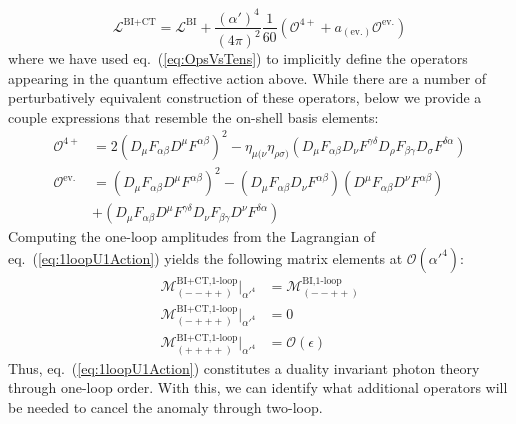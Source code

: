 \documentclass[11pt,letter]{article}
\def\eqn#1{eq.~(\ref{#1})}
\begin{document}
\begin{equation}
\label{eq:1loopU1Action}
\mathcal{L}^{\text{BI}+\text{CT}} = \mathcal{L}^{\text{BI}} + \frac{(\alpha')^4}{(4\pi)^2}\frac{1}{60}\left(\mathcal{O}^{4+}+ a_{({\text{ev.}})}\mathcal{O}^{\text{ev.}}\right)
\end{equation}
where we have used \eqn{eq:OpsVsTens} to implicitly define the operators appearing in the quantum effective action above. While there are a number of perturbatively equivalent construction of these operators, below we provide a couple expressions that resemble the on-shell basis elements:
\begin{equation}
\begin{split} 
\mathcal{O}^{4+} &= 2 (D_\mu F_{\alpha \beta} D^\mu  F^{\alpha \beta})^2 - \eta_{\mu(\nu}\eta_{\rho\sigma)}(D_\mu F_{\alpha \beta} D_\nu  F^{\gamma\delta} D_\rho F_{\beta \gamma } D_\sigma F^{\delta \alpha})
\\
\mathcal{O}^{\text{ev.}} &= 
(D_\mu F_{\alpha \beta} D^\mu  F^{\alpha \beta})^2 - (D_\mu F_{\alpha \beta} D_\nu  F^{\alpha \beta})(D^\mu F_{\alpha \beta} D^\nu  F^{\alpha \beta})
\\
&+(D_\mu F_{\alpha \beta} D^\mu  F^{\gamma\delta} D_\nu F_{\beta \gamma } D^\nu F^{\delta \alpha})
\end{split}
\end{equation}
Computing the one-loop amplitudes from the Lagrangian of \eqn{eq:1loopU1Action} yields the following matrix elements at $\mathcal{O}(\alpha'^4)$:
\begin{align}
\mathcal{M}^{\text{BI+CT,1-loop}}_{(--++)}\big|_{\alpha'^4} &= \mathcal{M}^{\text{BI,1-loop}}_{(--++)}  
\\
 \mathcal{M}^{\text{BI+CT,1-loop}}_{(-+++)}\big|_{\alpha'^4} &= 0
 \\
 \mathcal{M}^{\text{BI+CT,1-loop}}_{(++++)}\big|_{\alpha'^4}  &= \mathcal{O}(\epsilon)
\end{align}
Thus, \eqn{eq:1loopU1Action} constitutes a duality invariant photon theory through one-loop order. With this, we can identify what additional operators will be needed to cancel the anomaly through two-loop. 
\end{document}
